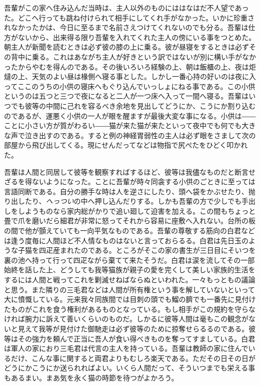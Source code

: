 \documentclass[12pt, openright]{book}
\begin{document}
吾輩がこの家へ住み込んだ当時は、主人以外のものにははなはだ不人望であった。どこへ行っても跳ね付けられて相手にしてくれ手がなかった。いかに珍重されなかったかは、今日に至るまで名前さえつけてくれないのでも分る。吾輩は仕方がないから、出来得る限り吾輩を入れてくれた主人の傍にいる事をつとめた。朝主人が新聞を読むときは必ず彼の膝の上に乗る。彼が昼寝をするときは必ずその背中に乗る。これはあながち主人が好きという訳ではないが別に構い手がなかったからやむを得んのである。その後いろいろ経験の上、朝は飯櫃の上、夜は炬燵の上、天気のよい昼は椽側へ寝る事とした。しかし一番心持の好いのは夜に入ってここのうちの小供の寝床へもぐり込んでいっしょにねる事である。この小供というのは五つと三つで夜になると二人が一つ床へ入って一間へ寝る。吾輩はいつでも彼等の中間に己れを容るべき余地を見出してどうにか、こうにか割り込むのであるが、運悪く小供の一人が眼を醒ますが最後大変な事になる。小供は――ことに小さい方が質がわるい――猫が来た猫が来たといって夜中でも何でも大きな声で泣き出すのである。すると例の神経胃弱性の主人は必ず眼をさまして次の部屋から飛び出してくる。現にせんだってなどは物指で尻ぺたをひどく叩かれた。

吾輩は人間と同居して彼等を観察すればするほど、彼等は我儘なものだと断言せざるを得ないようになった。ことに吾輩が時々同衾する小供のごときに至っては言語同断である。自分の勝手な時は人を逆さにしたり、頭へ袋をかぶせたり、抛り出したり、\emph{へっつい}の中へ押し込んだりする。しかも吾輩の方で少しでも手出しをしようものなら家内総がかりで追い廻して迫害を加える。この間もちょっと畳で爪を磨いだら細君が非常に怒ってそれから容易に座敷へ入れない。台所の板の間で他が顫えていても一向平気なものである。吾輩の尊敬する筋向の白君などは逢う度毎に人間ほど不人情なものはないと言っておらるる。白君は先日玉のような子猫を四疋産まれたのである。ところがそこの家の書生が三日目にそいつを裏の池へ持って行って四疋ながら棄てて来たそうだ。白君は涙を流してその一部始終を話した上、どうしても我等猫族が親子の愛を完くして美しい家族的生活をするには人間と戦ってこれを剿滅せねばならぬといわれた。一々もっともの議論と思う。また隣りの三毛君などは人間が所有権という事を解していないといって大に憤慨している。元来我々同族間では目刺の頭でも鰡の臍でも一番先に見付けたものがこれを食う権利があるものとなっている。もし相手がこの規約を守らなければ腕力に訴えて善いくらいのものだ。しかるに彼等人間は毫もこの観念がないと見えて我等が見付けた御馳走は必ず彼等のために掠奪せらるるのである。彼等はその強力を頼んで正当に吾人が食い得べきものを奪ってすましている。白君は軍人の家におり三毛君は代言の主人を持っている。吾輩は教師の家に住んでいるだけ、こんな事に関すると両君よりもむしろ楽天である。ただその日その日がどうにかこうにか送られればよい。いくら人間だって、そういつまでも栄える事もあるまい。まあ気を永く猫の時節を待つがよかろう。
\end{document}
